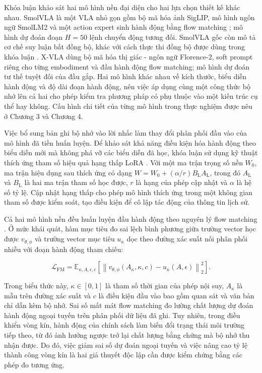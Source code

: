 Khóa luận khảo sát hai mô hình nền đại diện cho hai lựa chọn thiết kế khác nhau. SmolVLA \cite{smolvla2025} là một VLA nhỏ gọn gồm bộ mã hóa ảnh SigLIP, mô hình ngôn ngữ SmolLM2 và một action expert sinh hành động bằng flow matching \cite{flowmatching2023}; mô hình dự đoán đoạn $H=50$ lệnh chuyển động tương đối. SmolVLA gốc còn mô tả cơ chế suy luận bất đồng bộ, khác với cách thực thi đồng bộ được dùng trong khóa luận \cite{smolvla2025,smolvlaCheckpoint}. X-VLA \cite{xvla2025} dùng bộ mã hóa thị giác - ngôn ngữ Florence-2, soft prompt riêng cho từng embodiment và đầu hành động flow matching; mô hình dự đoán tư thế tuyệt đối của đầu gắp. Hai mô hình khác nhau về kích thước, biểu diễn hành động và độ dài đoạn hành động, nên việc áp dụng cùng một công thức bộ nhớ lên cả hai cho phép kiểm tra phương pháp có phụ thuộc vào một kiến trúc cụ thể hay không. Cấu hình chi tiết của từng mô hình trong thực nghiệm được nêu ở Chương 3 và Chương 4.

Việc bổ sung bản ghi bộ nhớ vào lời nhắc làm thay đổi phân phối đầu vào của mô hình đã tiền huấn luyện. Để khảo sát khả năng điều kiện hóa hành động theo biểu diễn mới mà không phá vỡ các biểu diễn đã học, khóa luận sử dụng kỹ thuật thích ứng tham số hiệu quả hạng thấp LoRA \cite{lora2021}. Với một ma trận trọng số nền $W_0$, ma trận hiệu dụng sau thích ứng có dạng $W = W_0 + (\alpha/r)B_{\mathrm{L}}A_{\mathrm{L}}$, trong đó $A_{\mathrm{L}}$ và $B_{\mathrm{L}}$ là hai ma trận tham số học được, $r$ là hạng của phép cập nhật và $\alpha$ là hệ số tỷ lệ. Cập nhật hạng thấp cho phép mô hình thích ứng trong một không gian tham số được kiểm soát, tạo điều kiện để cô lập tác động của thông tin lịch sử.

Cả hai mô hình nền đều huấn luyện đầu hành động theo nguyên lý flow matching \cite{flowmatching2023,smolvla2025,xvla2025}. Ở mức khái quát, hàm mục tiêu đo sai lệch bình phương giữa trường vector học được $v_{\theta,\phi}$ và trường vector mục tiêu $u_\kappa$ dọc theo đường xác suất nối phân phối nhiễu với đoạn hành động tham chiếu:

\begin{equation}
\mathcal L_{\mathrm{FM}}
= \mathbb E_{\kappa,A,\epsilon,c}\!
\left[\left\|v_{\theta,\phi}(A_\kappa,\kappa,c)-u_\kappa(A,\epsilon)\right\|_2^2\right].
\end{equation}

Trong biểu thức này, $\kappa \in [0, 1]$ là tham số thời gian của phép nội suy, $A_\kappa$ là mẫu trên đường xác suất và $c$ là điều kiện đầu vào bao gồm quan sát và văn bản chỉ dẫn kèm bộ nhớ. Sai số mất mát flow matching đo lường chất lượng dự đoán hành động ngoại tuyến trên phân phối dữ liệu đã ghi. Tuy nhiên, trong điều khiển vòng kín, hành động của chính sách làm biến đổi trạng thái môi trường tiếp theo, từ đó ảnh hưởng ngược trở lại chất lượng bằng chứng mà bộ nhớ thu nhận được. Do đó, việc giảm sai số dự đoán ngoại tuyến và việc nâng cao tỷ lệ thành công vòng kín là hai giả thuyết độc lập cần được kiểm chứng bằng các phép đo tương ứng.

